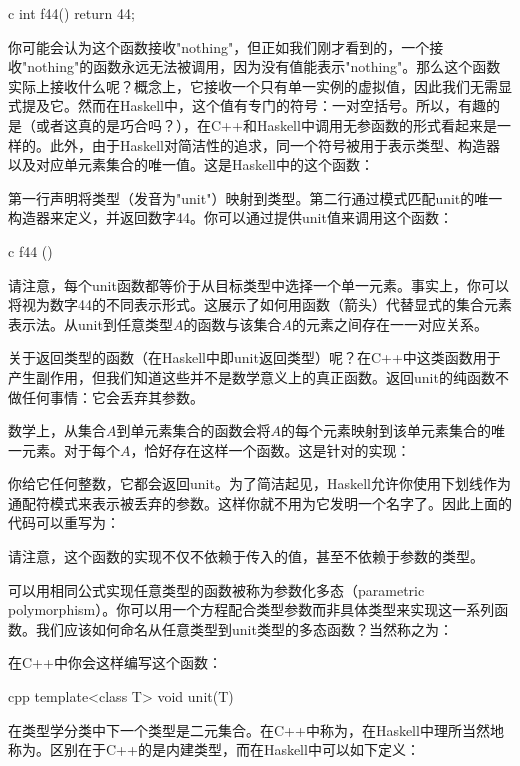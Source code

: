 \begin{snip}{c}
int f44() { return 44; }
\end{snip}
你可能会认为这个函数接收"nothing"，但正如我们刚才看到的，一个接收"nothing"的函数永远无法被调用，因为没有值能表示"nothing"。那么这个函数实际上接收什么呢？概念上，它接收一个只有单一实例的虚拟值，因此我们无需显式提及它。然而在Haskell中，这个值有专门的符号：一对空括号\code{()}。所以，有趣的是（或者这真的是巧合吗？），在C++和Haskell中调用无参函数的形式看起来是一样的。此外，由于Haskell对简洁性的追求，同一个符号\code{()}被用于表示类型、构造器以及对应单元素集合的唯一值。这是Haskell中的这个函数：

第一行声明将类型\code{()}（发音为"unit"）映射到类型。第二行通过模式匹配unit的唯一构造器\code{()}来定义，并返回数字44。你可以通过提供unit值\code{()}来调用这个函数：

\begin{snip}{c}
f44 ()
\end{snip}
请注意，每个unit函数都等价于从目标类型中选择一个单一元素。事实上，你可以将视为数字44的不同表示形式。这展示了如何用函数（箭头）代替显式的集合元素表示法。从unit到任意类型$A$的函数与该集合$A$的元素之间存在一一对应关系。

关于返回类型的函数（在Haskell中即unit返回类型）呢？在C++中这类函数用于产生副作用，但我们知道这些并不是数学意义上的真正函数。返回unit的纯函数不做任何事情：它会丢弃其参数。

数学上，从集合$A$到单元素集合的函数会将$A$的每个元素映射到该单元素集合的唯一元素。对于每个$A$，恰好存在这样一个函数。这是针对的实现：

你给它任何整数，它都会返回unit。为了简洁起见，Haskell允许你使用下划线作为通配符模式来表示被丢弃的参数。这样你就不用为它发明一个名字了。因此上面的代码可以重写为：

请注意，这个函数的实现不仅不依赖于传入的值，甚至不依赖于参数的类型。

可以用相同公式实现任意类型的函数被称为参数化多态（parametric polymorphism）。你可以用一个方程配合类型参数而非具体类型来实现这一系列函数。我们应该如何命名从任意类型到unit类型的多态函数？当然称之为：

在C++中你会这样编写这个函数：

\begin{snip}{cpp}
template<class T>
void unit(T) {}
\end{snip}
在类型学分类中下一个类型是二元集合。在C++中称为，在Haskell中理所当然地称为。区别在于C++的是内建类型，而在Haskell中可以如下定义：

